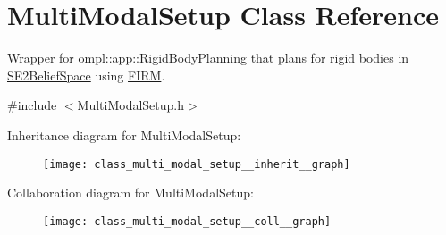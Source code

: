 \hypertarget{class_multi_modal_setup}{\section{Multi\-Modal\-Setup Class Reference}
\label{class_multi_modal_setup}
}


Wrapper for ompl\-::app\-::\-Rigid\-Body\-Planning that plans for rigid bodies in \hyperlink{class_s_e2_belief_space}{S\-E2\-Belief\-Space} using \hyperlink{class_f_i_r_m}{F\-I\-R\-M}.  




{\ttfamily \#include $<$Multi\-Modal\-Setup.\-h$>$}



Inheritance diagram for Multi\-Modal\-Setup\-:\nopagebreak
\begin{figure}[H]
\begin{center}
\leavevmode
\texttt{[image: class\_multi\_modal\_setup\_\_inherit\_\_graph]}
\end{center}
\end{figure}


Collaboration diagram for Multi\-Modal\-Setup\-:\nopagebreak
\begin{figure}[H]
\begin{center}
\leavevmode
\texttt{[image: class\_multi\_modal\_setup\_\_coll\_\_graph]}
\end{center}
\end{figure}
